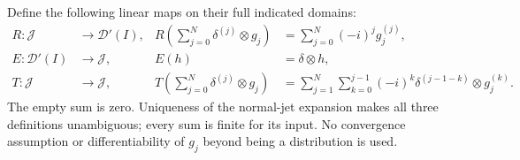 Define the following linear maps on their full indicated domains:
\begin{align}
 R:\mathcal J&\longrightarrow\mathcal D'(I),&
 R\left(\sum_{j=0}^N\delta^{(j)}\otimes g_j\right)
 &=\sum_{j=0}^N(-i)^j g_j^{(j)},
 &&\tag{SDB10}\label{eq:SDB-residue}\\
 E:\mathcal D'(I)&\longrightarrow\mathcal J,&
 E(h)&=\delta\otimes h,
 &&\tag{SDB11}\label{eq:SDB-section}\\
 T:\mathcal J&\longrightarrow\mathcal J,&
 T\left(\sum_{j=0}^N\delta^{(j)}\otimes g_j\right)
 &=\sum_{j=1}^N\sum_{k=0}^{j-1}
       (-i)^k\delta^{(j-1-k)}\otimes g_j^{(k)}.
 &&\tag{SDB12}\label{eq:SDB-homotopy}
\end{align}
The empty sum is zero. Uniqueness of the normal-jet expansion makes
all three definitions unambiguous; every sum is finite for its input.
No convergence assumption or differentiability of $g_j$ beyond being
a distribution is used.

